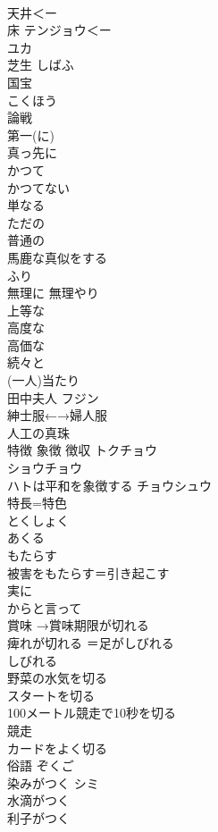 \documentclass[8pt]{extreport}
\begin{document}
\begin{CJK}{UTF8}{min}
\\	天井＜ー
\\	床	テンジョウ＜ー
\\	ユカ 
\\	芝生	しばふ 
\\	国宝	
\\	こくほう
\\	論戦	
\\	第一(に)	
\\	真っ先に	
\\	かつて	
\\	かつてない
\\	単なる
\\	ただの
\\	普通の
\\	馬鹿な真似をする	
\\	ふり	
\\	無理に 無理やり	
\\	上等な	
\\	高度な	
\\	高価な	
\\	続々と	
\\	(一人)当たり	
\\	田中夫人	フジン 
\\	紳士服←→婦人服	
\\	人工の真珠	
\\	特徴 象徴 徴収	トクチョウ
\\	ショウチョウ
\\	ハトは平和を象徴する チョウシュウ
\\	特長=特色	
\\	とくしょく
\\	あくる	
\\	もたらす	
\\	被害をもたらす＝引き起こす
\\	実に	
\\	からと言って	
\\	賞味 →賞味期限が切れる	
\\	痺れが切れる ＝足がしびれる	
\\	しびれる
\\	野菜の水気を切る	
\\	スタートを切る	
\\	100メートル競走で10秒を切る	
\\	競走
\\	カードをよく切る	
\\	俗語	ぞくご 
\\	染みがつく	シミ 
\\	水滴がつく	
\\	利子がつく	

\end{CJK}
\end{document}
